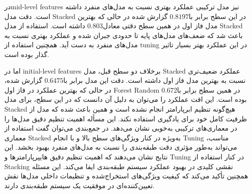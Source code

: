 \documentclass[a4paper,12pt]{article}
\begin{document}
 
درmid-level features نیز مدل ترکیبی عملکرد بهتری نسبت به مدل‌های منفرد داشته است. دقت مدل Stacked در این سطح برابر با$ 0.8197$ گزارش شده در حالی که بهترین مدل فاز اول در همین سطح دقتی معادل$ 0.803$ داشته است. استفاده از مدل Stacked باعث شد که ضعف‌های مدل‌های پایه تا حدودی جبران شده و عملکرد بهتری نسبت به مدل‌های منفرد به دست آید. همچنین استفاده از ‫‪tuning‬‬ در این عملکرد بهتر بسیار تاثیر گذار بوده است.

اما در initial-level features برخلاف دو سطح قبل، مدل Stacked عملکرد ضعیف‌تری نسبت به بهترین مدل فاز اول داشته است. دقت این مدل برابر با$ 0.6475$ گزارش شده، در حالی که بهترین عملکرد در فاز اول 
 Forest
Random
 در همین سطح برابر با$ 0.672$ بوده است. این افت عملکرد را می‌توان به دلیل آن دانست که در این سطح، برای مدل Stacked هیچ‌گونه تنظیم ابرپارامتر انجام نشده است و همین باعث شده که مدل از ظرفیت کامل خود برای یادگیری استفاده نکند. این مسأله اهمیت تنظیم دقیق مدل‌ها را در معماری‌های ترکیبی به‌خوبی نشان می‌دهد.
در جمع‌بندی می‌توان گفت استفاده از معماری Stacked به‌ویژه در کنار ویژگی‌های سطح بالا و با انجام Tuning مناسب، می‌تواند به‌طور مؤثری دقت طبقه‌بندی را نسبت به مدل‌های منفرد بهبود بخشد. این نتایج نشان می‌دهند که اهمیت تنظیم دقیق هایپرپارامترها و Tuning در کنار استفاده از Stacking نقشی کلیدی در بهبود عملکرد سیستم طبقه‌بندی ایفا می‌کند. این مسئله همچنین تأکید می‌کند که کیفیت ویژگی‌های استخراج‌شده و تنظیمات داخلی مدل‌ها نقش تعیین‌کننده‌ای در موفقیت یک سیستم طبقه‌بندی دارند.
\end{document}
